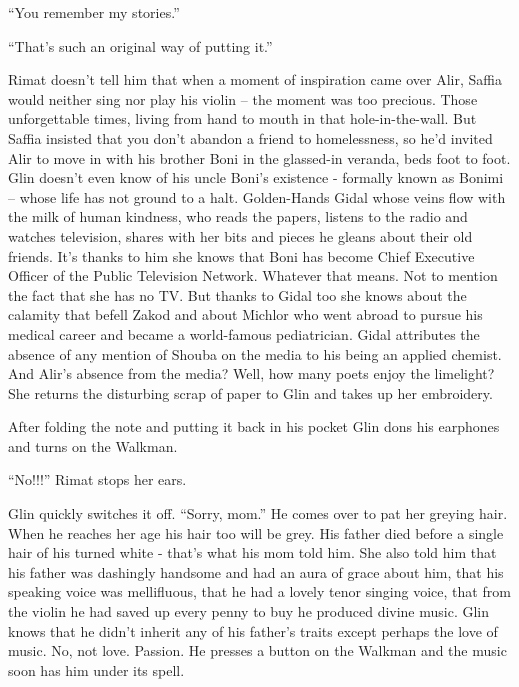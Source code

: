 \documentclass[twoside,11pt]{book}
\begin{document}
``You remember my stories.''

``That's such an original way of putting it.''

Rimat doesn't tell him that when a moment of inspiration came over
Alir, Saffia would neither sing nor play his violin -- the moment was too precious. Those unforgettable times, living
from hand to mouth in that hole-in-the-wall. But Saffia insisted that you don't abandon a friend to
homelessness, so he'd invited Alir to move in with his brother Boni in the
glassed-in veranda, beds foot to foot. Glin doesn't even know of his uncle Boni's existence - formally known as
Bonimi -- whose life has not ground to a halt. Golden-Hands Gidal whose veins flow with the milk of human kindness, who
reads the papers, listens to the radio and watches television, shares with her bits and pieces he gleans about their
old friends. It's thanks to him she knows that Boni has become Chief Executive Officer of the Public Television
Network. Whatever that means. Not to mention the fact that she has no TV. But thanks to Gidal too she knows about the
calamity that befell Zakod and about Michlor who went abroad to pursue his medical career and became a world-famous
pediatrician. Gidal attributes the absence of any mention of Shouba on the media to his being an applied chemist. And
Alir's absence from the media? Well, how many poets enjoy the limelight? She returns the disturbing
scrap of paper to Glin and takes up her embroidery.

After folding the note
and putting it back in his pocket Glin dons his earphones and turns
on the Walkman.

``No!!!'' Rimat stops her ears.

Glin quickly switches it off. ``Sorry, mom.'' He comes over to pat her
greying hair.  When he reaches her age his hair too will be grey.  His
father died before a single hair of his
turned white - that's what his mom told him. She also told him that
his father was dashingly handsome and had an aura of grace about him,
that his speaking voice was mellifluous, that he had a lovely tenor
singing voice, that from the violin he had saved up every penny to buy
he produced divine music. Glin knows that he didn't inherit any of his
father's traits except perhaps the love of music. No, not
love. Passion. He presses a button on the Walkman and the music soon
has him under its spell.


\chapter{}
\end{document}
